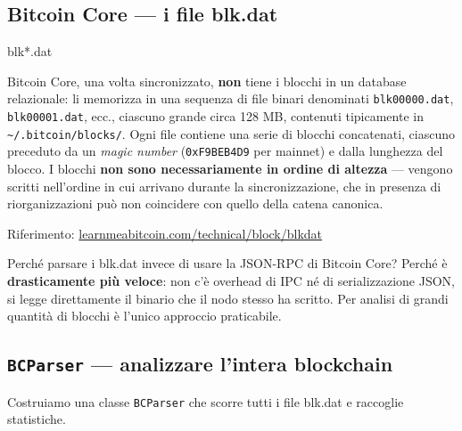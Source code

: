 \documentclass[
  italian,
  openany]{book}
\begin{document}
\subsection{Bitcoin Core --- i file
blk.dat}\label{bitcoin-core-i-file-blk.dat}

\begin{calloutdefinition}{blk*.dat}

Bitcoin Core, una volta sincronizzato, \textbf{non} tiene i blocchi in
un database relazionale: li memorizza in una sequenza di file binari
denominati \texttt{blk00000.dat}, \texttt{blk00001.dat}, ecc., ciascuno
grande circa 128 MB, contenuti tipicamente in
\texttt{\textasciitilde{}/.bitcoin/blocks/}. Ogni file contiene una
serie di blocchi concatenati, ciascuno preceduto da un \emph{magic
number} (\texttt{0xF9BEB4D9} per mainnet) e dalla lunghezza del blocco.
I blocchi \textbf{non sono necessariamente in ordine di altezza} ---
vengono scritti nell'ordine in cui arrivano durante la sincronizzazione,
che in presenza di riorganizzazioni può non coincidere con quello della
catena canonica.

Riferimento:
\href{https://learnmeabitcoin.com/technical/block/blkdat/}{learnmeabitcoin.com/technical/block/blkdat}

\end{calloutdefinition}

Perché parsare i blk.dat invece di usare la JSON-RPC di Bitcoin Core?
Perché è \textbf{drasticamente più veloce}: non c'è overhead di IPC né
di serializzazione JSON, si legge direttamente il binario che il nodo
stesso ha scritto. Per analisi di grandi quantità di blocchi è l'unico
approccio praticabile.

\subsection{\texorpdfstring{\texttt{BCParser} --- analizzare l'intera
blockchain}{BCParser --- analizzare l'intera blockchain}}\label{bcparser-analizzare-lintera-blockchain}

Costruiamo una classe \texttt{BCParser} che scorre tutti i file blk.dat
e raccoglie statistiche.
\end{document}
